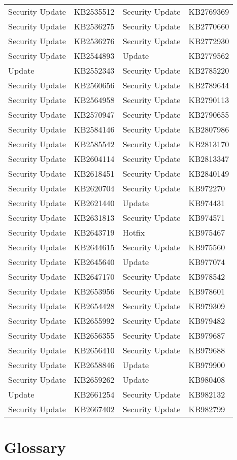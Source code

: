 \begin{longtable}{ l | l || l | l }
  Security Update  & KB2535512  & Security Update  & KB2769369  \\
  Security Update  & KB2536275  & Security Update  & KB2770660  \\
  Security Update  & KB2536276  & Security Update  & KB2772930  \\
  Security Update  & KB2544893  & Update           & KB2779562  \\
  Update           & KB2552343  & Security Update  & KB2785220  \\
  Security Update  & KB2560656  & Security Update  & KB2789644  \\
  Security Update  & KB2564958  & Security Update  & KB2790113  \\
  Security Update  & KB2570947  & Security Update  & KB2790655  \\
  Security Update  & KB2584146  & Security Update  & KB2807986  \\
  Security Update  & KB2585542  & Security Update  & KB2813170  \\
  Security Update  & KB2604114  & Security Update  & KB2813347  \\
  Security Update  & KB2618451  & Security Update  & KB2840149  \\
  Security Update  & KB2620704  & Security Update  & KB972270   \\
  Security Update  & KB2621440  & Update           & KB974431   \\
  Security Update  & KB2631813  & Security Update  & KB974571   \\
  Security Update  & KB2643719  & Hotfix           & KB975467   \\
  Security Update  & KB2644615  & Security Update  & KB975560   \\
  Security Update  & KB2645640  & Update           & KB977074   \\
  Security Update  & KB2647170  & Security Update  & KB978542   \\
  Security Update  & KB2653956  & Security Update  & KB978601   \\
  Security Update  & KB2654428  & Security Update  & KB979309   \\
  Security Update  & KB2655992  & Security Update  & KB979482   \\
  Security Update  & KB2656355  & Security Update  & KB979687   \\
  Security Update  & KB2656410  & Security Update  & KB979688   \\
  Security Update  & KB2658846  & Update           & KB979900   \\
  Security Update  & KB2659262  & Update           & KB980408   \\
  Update           & KB2661254  & Security Update  & KB982132   \\
  Security Update  & KB2667402  & Security Update  & KB982799   \\
\end{longtable}

\chapter{Glossary} \label{app:glossary}
\printglossary[type=\acronymtype,style=super,title=]
